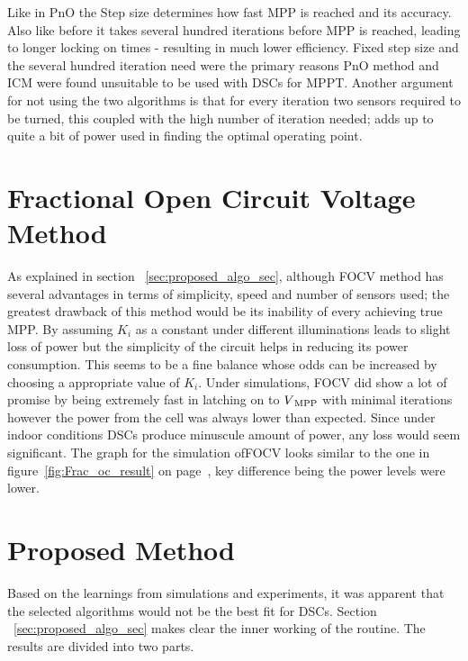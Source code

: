  Like in \ac{PnO} the Step size determines how fast \ac{MPP} is reached and its accuracy. Also like before it takes several hundred iterations before \ac{MPP} is reached, leading to longer locking on times - resulting in much lower efficiency. Fixed step size and the several hundred iteration need were the primary reasons \ac{PnO} method and \ac{ICM} were found unsuitable to be used with \ac{DSCs} for \ac{MPPT}. Another argument for not using the two algorithms is that for every iteration two sensors required to be turned, this coupled with the high number of iteration needed; adds up to quite a bit of power used in finding the optimal operating point.             
 
         
 \section{Fractional Open Circuit Voltage Method }
 
As explained in section ~\ref{sec:proposed_algo_sec}, although \ac{FOCV} method has several advantages in terms of simplicity, speed and number of sensors used; the greatest drawback of this method would be its inability of every achieving true \ac{MPP}. By assuming $K_{i}$ as a constant under different illuminations leads to slight loss of power but the simplicity of the circuit helps in reducing its power consumption. This seems to be a fine balance whose odds can be increased by choosing a appropriate value of $K_{i}$. Under simulations, \ac{FOCV} did show a lot of promise by being extremely fast in latching on to $V\textsubscript{MPP}$ with minimal iterations however the power from the cell was always lower than expected. Since under indoor conditions \ac{DSCs} produce minuscule amount of power, any loss would seem significant. The graph for the simulation of\ac{FOCV} looks similar to the one in figure~\ref{fig:Frac_oc_result} on page~\pageref{fig:Frac_oc_result}, key difference being the power levels were lower.             

\section{Proposed Method }

Based on the learnings from simulations and experiments, it was apparent that the selected algorithms would not be the best fit for \ac{DSCs}. Section ~\ref{sec:proposed_algo_sec} makes clear the inner working of the routine. The results are divided into two parts.\\
	

